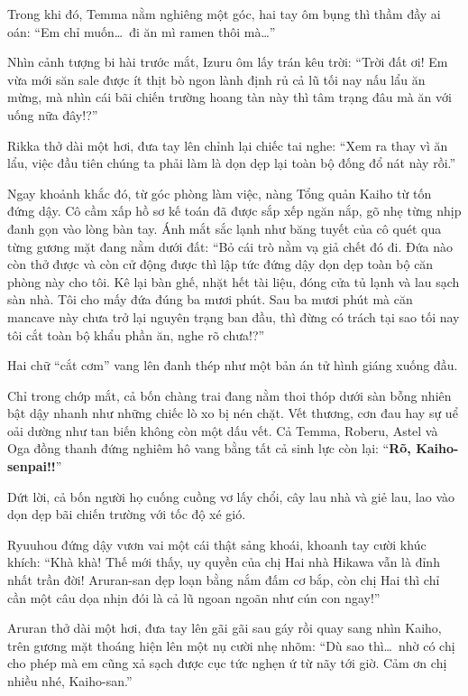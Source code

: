 \documentclass[../main.tex]{subfiles}
\begin{document}
Trong khi đó, Temma nằm nghiêng một góc, hai tay ôm bụng thì thầm đầy ai oán: ``Em chỉ muốn\dots\ đi ăn mì ramen thôi mà\dots''

Nhìn cảnh tượng bi hài trước mắt, Izuru ôm lấy trán kêu trời: ``Trời đất ơi! Em vừa mới săn sale được ít thịt bò ngon lành định rủ cả lũ tối nay nấu lẩu ăn mừng, mà nhìn cái bãi chiến trường hoang tàn này thì tâm trạng đâu mà ăn với uống nữa đây!?''

Rikka thở dài một hơi, đưa tay lên chỉnh lại chiếc tai nghe: ``Xem ra thay vì ăn lẩu, việc đầu tiên chúng ta phải làm là dọn dẹp lại toàn bộ đống đổ nát này rồi.''

Ngay khoảnh khắc đó, từ góc phòng làm việc, nàng Tổng quản Kaiho từ tốn đứng dậy. Cô cầm xấp hồ sơ kế toán đã được sắp xếp ngăn nắp, gõ nhẹ từng nhịp đanh gọn vào lòng bàn tay. Ánh mắt sắc lạnh như băng tuyết của cô quét qua từng gương mặt đang nằm dưới đất: ``Bỏ cái trò nằm vạ giả chết đó đi. Đứa nào còn thở được và còn cử động được thì lập tức đứng dậy dọn dẹp toàn bộ căn phòng này cho tôi. Kê lại bàn ghế, nhặt hết tài liệu, đóng cửa tủ lạnh và lau sạch sàn nhà. Tôi cho mấy đứa đúng ba mươi phút. Sau ba mươi phút mà căn mancave này chưa trở lại nguyên trạng ban đầu, thì đừng có trách tại sao tối nay tôi cắt toàn bộ khẩu phần ăn, nghe rõ chưa!?''

Hai chữ ``cắt cơm'' vang lên đanh thép như một bản án tử hình giáng xuống đầu.

Chỉ trong chớp mắt, cả bốn chàng trai đang nằm thoi thóp dưới sàn bỗng nhiên bật dậy nhanh như những chiếc lò xo bị nén chặt. Vết thương, cơn đau hay sự uể oải dường như tan biến không còn một dấu vết. Cả Temma, Roberu, Astel và Oga đồng thanh đứng nghiêm hô vang bằng tất cả sinh lực còn lại: ``\textbf{Rõ, Kaiho-senpai!!}''

Dứt lời, cả bốn người họ cuống cuồng vơ lấy chổi, cây lau nhà và giẻ lau, lao vào dọn dẹp bãi chiến trường với tốc độ xé gió.

Ryuuhou đứng dậy vươn vai một cái thật sảng khoái, khoanh tay cười khúc khích: ``Khà khà! Thế mới thấy, uy quyền của chị Hai nhà Hikawa vẫn là đỉnh nhất trần đời! Aruran-san dẹp loạn bằng nắm đấm cơ bắp, còn chị Hai thì chỉ cần một câu dọa nhịn đói là cả lũ ngoan ngoãn như cún con ngay!''

Aruran thở dài một hơi, đưa tay lên gãi gãi sau gáy rồi quay sang nhìn Kaiho, trên gương mặt thoáng hiện lên một nụ cười nhẹ nhõm: ``Dù sao thì\dots\ nhờ có chị cho phép mà em cũng xả sạch được cục tức nghẹn ứ từ nãy tới giờ. Cảm ơn chị nhiều nhé, Kaiho-san.''
\end{document}
